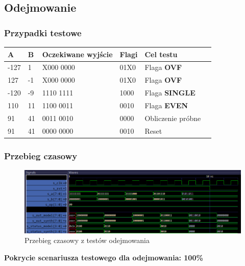 \documentclass[12pt]{article}
\begin{document}
	\subsection*{Odejmowanie}
	
	\subsubsection*{Przypadki testowe}
	
		\begin{table}[!ht]
			\centering
				\begin{adjustbox}{center}
			\begin{tabular}{|l|l|l|l|l|l|}
				\hline
				\textbf{A} & \textbf{B} & \textbf{Oczekiwane wyjście} & \textbf{Flagi} & \textbf{Cel testu} \\ \hline
				-127 & 1 &  X000 0000 & 01X0 & Flaga \textbf{OVF} \\ \hline
				127 & -1 &  X000 0000 & 01X0 & Flaga \textbf{OVF} \\ \hline
				-120 & -9 &  1110 1111 & 1000 & Flaga \newline \textbf{SINGLE} \\ \hline
				110 & 11 & 1100 0011 & 0010 & Flaga \textbf{EVEN} \\ \hline
				91 & 41 &  0011 0010 & 0000& Obliczenie próbne \\ \hline
				91 & 41 &  0000 0000 & 0010 & Reset \\ \hline
			\end{tabular}
			\end{adjustbox}
		\end{table}
\vspace{-20pt}
	\subsubsection*{Przebieg czasowy}
		\begin{figure}[!h]
		\begin{center}
			\includegraphics[width=\textwidth]{../Testy/Wyniki_testow/Testy_sub.png}
			\caption*{Przebieg czasowy z testów odejmowania}
			\label{figure:test_sub}
		\end{center}
	\end{figure}
	\vspace{-20pt}
	\textbf{Pokrycie scenariusza testowego dla odejmowania: 100\%}
	
\end{document}
